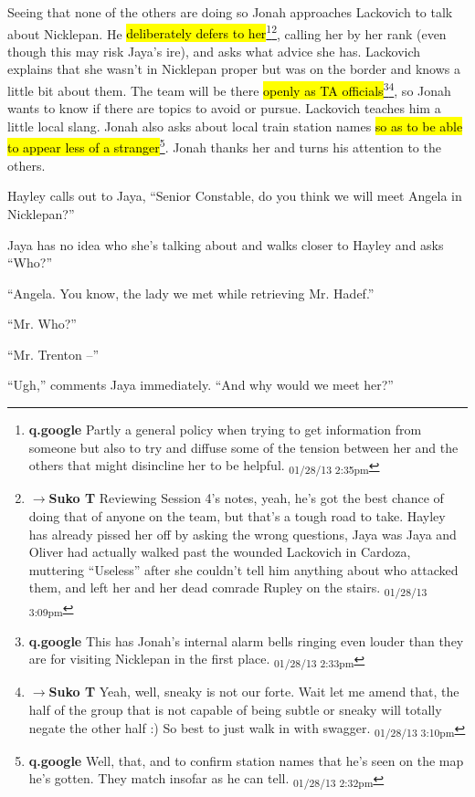 Seeing that none of the others are doing so Jonah approaches Lackovich to talk about Nicklepan.  He \hl{deliberately defers to her}\footnote{\textbf{q.google }Partly a general policy when trying to get information from someone but also to try and diffuse some of the tension between her and the others that might disincline her to be helpful. \textsubscript{01/28/13 2:35pm}}\footnote{$\rightarrow$\textbf{Suko T }Reviewing Session 4's notes, yeah, he's got the best chance of doing that of anyone on the team, but that's a tough road to take.  Hayley has already pissed her off by asking the wrong questions, Jaya was Jaya and Oliver had actually walked past the wounded Lackovich in Cardoza, muttering ``Useless'' after she couldn't tell him anything about who attacked them, and left her and her dead comrade Rupley on the stairs. \textsubscript{01/28/13 3:09pm}}, calling her by her rank (even though this may risk Jaya's ire), and asks what advice she has.  Lackovich explains that she wasn't in Nicklepan proper but was on the border and knows a little bit about them.  The team will be there \hl{openly as TA officials}\footnote{\textbf{q.google }This has Jonah's internal alarm bells ringing even louder than they are for visiting Nicklepan in the first place. \textsubscript{01/28/13 2:33pm}}\footnote{$\rightarrow$\textbf{Suko T }Yeah, well, sneaky is not our forte.  Wait let me amend that, the half of the group that is not capable of being subtle or sneaky will totally negate the other half :)  So best to just walk in with swagger. \textsubscript{01/28/13 3:10pm}}, so Jonah wants to know if there are topics to avoid or pursue.  Lackovich teaches him a little local slang.  Jonah also asks about local train station names \hl{so as to be able to appear less of a stranger}\footnote{\textbf{q.google }Well, that, and to confirm station names that he's seen on the map he's gotten.  They match insofar as he can tell. \textsubscript{01/28/13 2:32pm}}.  Jonah thanks her and turns his attention to the others.



Hayley calls out to Jaya, ``Senior Constable, do you think we will meet Angela in Nicklepan?''

Jaya has no idea who she's talking about and walks closer to Hayley and asks ``Who?''

``Angela.  You know, the lady we met while retrieving Mr. Hadef.''

``Mr. Who?''

``Mr. Trenton --''

``Ugh,'' comments Jaya immediately. ``And why would we meet her?''

